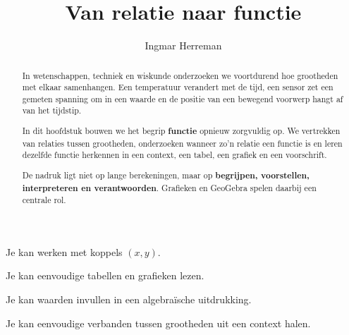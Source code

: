 \documentclass{ximera}
\title{Van relatie naar functie}
\author{Ingmar Herreman}
\begin{document}










\begin{abstract}
In wetenschappen, techniek en wiskunde onderzoeken we voortdurend hoe
grootheden met elkaar samenhangen. Een temperatuur verandert met de tijd,
een sensor zet een gemeten spanning om in een waarde en de positie van een
bewegend voorwerp hangt af van het tijdstip.

In dit hoofdstuk bouwen we het begrip \textbf{functie} opnieuw zorgvuldig op.
We vertrekken van relaties tussen grootheden, onderzoeken wanneer zo'n relatie
een functie is en leren dezelfde functie herkennen in een context, een tabel,
een grafiek en een voorschrift.

De nadruk ligt niet op lange berekeningen, maar op \textbf{begrijpen,
voorstellen, interpreteren en verantwoorden}. Grafieken en GeoGebra spelen
daarbij een centrale rol.
\end{abstract}

\maketitle


\begin{voorkennis}
    \item Je kan werken met koppels \((x,y)\).
    \item Je kan eenvoudige tabellen en grafieken lezen.
    \item Je kan waarden invullen in een algebraïsche uitdrukking.
    \item Je kan eenvoudige verbanden tussen grootheden uit een context halen.
\end{voorkennis}
\end{document}
